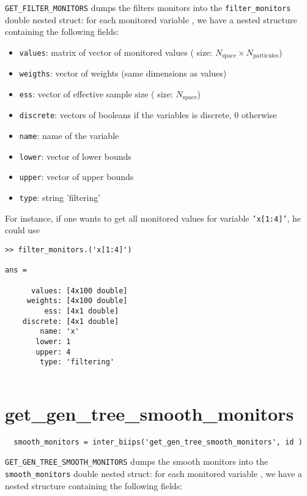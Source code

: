 \documentclass[11pt]{article}
\begin{document}
 \texttt{GET\_FILTER\_MONITORS} dumps the filters monitors into the \texttt{filter\_monitors} double nested struct: for each monitored variable , we have
  a nested structure containing the following fields:
  \begin{itemize}
   \item \texttt{values}: matrix of vector of monitored values ( size: $N_{\mbox{space}} \times N_{\mbox{particules}}$)
   \item \texttt{weigths}: vector of weights (same dimensions as values)
   \item \texttt{ess}: vector of effective  sample size ( size: $N_{\mbox{space}}$)
   \item \texttt{discrete}: vectors of booleans if the variables is discrete, 0 otherwise
   \item \texttt{name}: name of the variable
   \item \texttt{lower}: vector of lower bounds
   \item \texttt{upper}: vector of upper bounds
   \item \texttt{type}: string  'filtering'
   \end{itemize}

  For instance, if one wants to get all monitored values for variable \texttt{'x[1:4]'}, he could use
 \begin{lstlisting}
>> filter_monitors.('x[1:4]') 

ans = 

      values: [4x100 double]
     weights: [4x100 double]
         ess: [4x1 double]
    discrete: [4x1 double]
        name: 'x'
       lower: 1
       upper: 4
        type: 'filtering'
 
 \end{lstlisting}

 \section{get\_gen\_tree\_smooth\_monitors}
 
 \begin{lstlisting}
  smooth_monitors = inter_biips('get_gen_tree_smooth_monitors', id )
 \end{lstlisting}
 
 \texttt{GET\_GEN\_TREE\_SMOOTH\_MONITORS} dumps the smooth monitors into the \texttt{smooth\_monitors} double nested struct: for each monitored variable , we have
  a nested structure containing the following fields:
\end{document}
